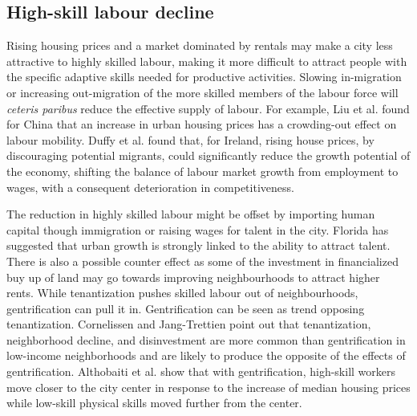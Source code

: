 \subsection{High-skill labour decline}
Rising housing prices and a market dominated by rentals may make a city less attractive to highly skilled labour, making it more difficult to attract people with the specific adaptive skills needed for productive activities. %
Slowing in-migration or increasing out-migration of the more skilled members of the labour force will \textit{ceteris paribus} reduce the effective supply of labour. 
For example, Liu et al. \cite{liuImpactUrbanHousing2023} found for China that an increase in urban housing prices has a crowding-out effect on labour mobility.  Duffy et al.  \cite{duffyRisingHousePrices2005} found that, for Ireland, rising house prices, by discouraging potential migrants, could significantly reduce the growth potential of the economy, shifting the balance of labour market growth from employment to wages, with a consequent deterioration in competitiveness. %

The reduction in highly skilled labour might be offset by importing human capital though immigration or raising wages for talent in the city. Florida  \cite{floridaCompetingAgeTalent2005, floridaCreativeClassEconomic2014} has suggested that urban growth is strongly linked to the ability to attract talent. 
There is also a possible counter effect as some of the investment in financialized buy up of land may go towards improving neighbourhoods to attract higher rents.  
While \gls{tenantization} pushes skilled labour out of neighbourhoods, \gls{gentrification} can pull it in. Gentrification can be seen as trend opposing tenantization. Cornelissen and Jang-Trettien \cite{cornelissenHousingContextNeighborhood2023} point out that tenantization, neighborhood decline, and disinvestment are more common than gentrification in low-income neighborhoods and are likely to produce the opposite of the effects of gentrification. Althobaiti et al. \cite{althobaitiHousingPricesSkills2021a} %
show that with gentrification, high-skill workers %
move closer to the city center in response to the increase of median housing prices while low-skill physical skills moved further from the center.  


